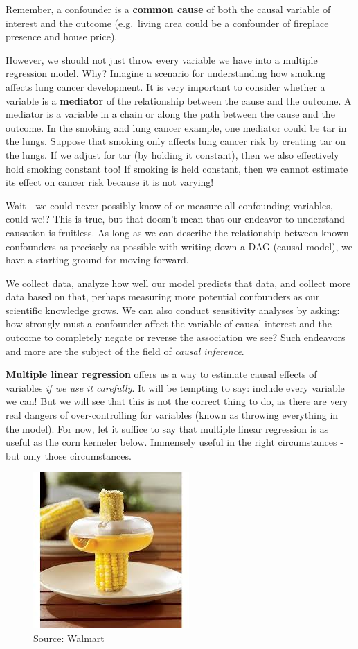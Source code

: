 \documentclass[
]{book}
\begin{document}
Remember, a confounder is a \textbf{common cause} of both the causal variable of interest and the outcome (e.g.~living area could be a confounder of fireplace presence and house price).

However, we should not just throw every variable we have into a multiple regression model. Why? Imagine a scenario for understanding how smoking affects lung cancer development. It is very important to consider whether a variable is a \textbf{mediator} of the relationship between the cause and the outcome. A mediator is a variable in a chain or along the path between the cause and the outcome. In the smoking and lung cancer example, one mediator could be tar in the lungs. Suppose that smoking only affects lung cancer risk by creating tar on the lungs. If we adjust for tar (by holding it constant), then we also effectively hold smoking constant too! If smoking is held constant, then we cannot estimate its effect on cancer risk because it is not varying!

Wait - we could never possibly know of or measure all confounding variables, could we!? This is true, but that doesn't mean that our endeavor to understand causation is fruitless. As long as we can describe the relationship between known confounders as precisely as possible with writing down a DAG (causal model), we have a starting ground for moving forward.

We collect data, analyze how well our model predicts that data, and collect more data based on that, perhaps measuring more potential confounders as our scientific knowledge grows. We can also conduct sensitivity analyses by asking: how strongly must a confounder affect the variable of causal interest and the outcome to completely negate or reverse the association we see? Such endeavors and more are the subject of the field of \emph{causal inference}.

\textbf{Multiple linear regression} offers us a way to estimate causal effects of variables \emph{if we use it carefully}. It will be tempting to say: include every variable we can! But we will see that this is not the correct thing to do, as there are very real dangers of over-controlling for variables (known as throwing everything in the model). For now, let it suffice to say that multiple linear regression is as useful as the corn kerneler below. Immensely useful in the right circumstances - but only those circumstances.

\begin{figure}
\centering
\includegraphics{Photos/corn.jpeg}
\caption{Source: \href{https://www.walmart.com/ip/Corn-Kerneler-w-Stainless-Steel-Blades/139735616}{Walmart}}
\end{figure}
\end{document}
